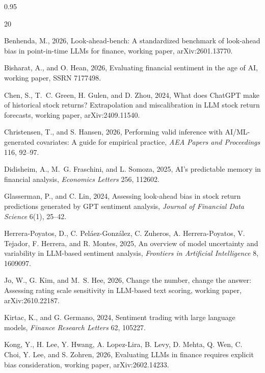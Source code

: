 \documentclass[11pt]{article}
\begin{document}
\begin{spacing}{0.95}
\small
\begin{thebibliography}{20}
\setlength{\itemsep}{1pt}

Benhenda, M., 2026, Look-ahead-bench: A standardized benchmark of look-ahead bias in point-in-time LLMs for finance, working paper, arXiv:2601.13770.

Bisharat, A., and O. Hean, 2026, Evaluating financial sentiment in the age of AI, working paper, SSRN 7177498.

Chen, S., T.~C. Green, H. Gulen, and D. Zhou, 2024, What does ChatGPT make of historical stock returns? Extrapolation and miscalibration in LLM stock return forecasts, working paper, arXiv:2409.11540.

Christensen, T., and S. Hansen, 2026, Performing valid inference with AI/ML-generated covariates: A guide for empirical practice, \emph{AEA Papers and Proceedings} 116, 92--97.

Didisheim, A., M.~G. Fraschini, and L. Somoza, 2025, AI's predictable memory in financial analysis, \emph{Economics Letters} 256, 112602.

Glasserman, P., and C. Lin, 2024, Assessing look-ahead bias in stock return predictions generated by GPT sentiment analysis, \emph{Journal of Financial Data Science} 6(1), 25--42.

Herrera-Poyatos, D., C. Pel\'aez-Gonz\'alez, C. Zuheros, A. Herrera-Poyatos, V. Tejador, F. Herrera, and R. Montes, 2025, An overview of model uncertainty and variability in LLM-based sentiment analysis, \emph{Frontiers in Artificial Intelligence} 8, 1609097.

Jo, W., G. Kim, and M.~S. Hee, 2026, Change the number, change the answer: Assessing rating scale sensitivity in LLM-based text scoring, working paper, arXiv:2610.22187.

Kirtac, K., and G. Germano, 2024, Sentiment trading with large language models, \emph{Finance Research Letters} 62, 105227.

Kong, Y., H. Lee, Y. Hwang, A. Lopez-Lira, B. Levy, D. Mehta, Q. Wen, C. Choi, Y. Lee, and S. Zohren, 2026, Evaluating LLMs in finance requires explicit bias consideration, working paper, arXiv:2602.14233.


\end{thebibliography}
\end{spacing}
\end{document}
